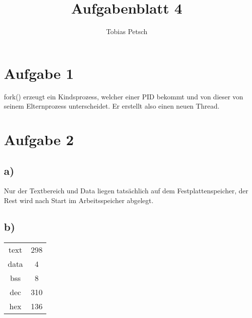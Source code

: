 \documentclass[a4paper,12pt]{article}
\title{Aufgabenblatt 4}
\author{Tobias Petsch}
\date{}
\begin{document}
\maketitle

\section*{Aufgabe 1}
fork() erzeugt ein Kindsprozess, welcher einer PID bekommt und von dieser von seinem Elternprozess unterscheidet.
Er erstellt also einen neuen Thread.

\section*{Aufgabe 2}

\subsection*{a)}

Nur der Textbereich und Data liegen tatsächlich auf dem Festplattenspeicher, der Rest wird nach Start im Arbeitsspeicher abgelegt.

\subsection*{b)}

\begin{table}[H]
    \centering
    \begin{tabular}{|c|c|}
    \hline
    text & 298 \\
    data   & 4   \\
    bss   & 8   \\
    dec & 310\\
    hex & 136 \\
    \hline
    \end{tabular}
\end{table}
\end{document}
